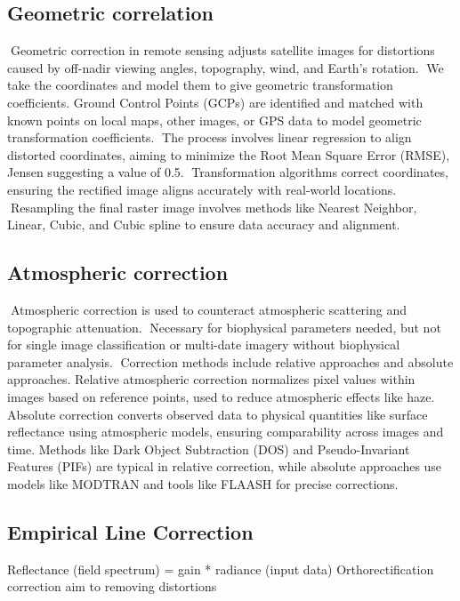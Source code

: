 \documentclass[
  letterpaper,
  DIV=11,
  numbers=noendperiod]{scrreprt}
\begin{document}
\subsection{Geometric correlation}\label{geometric-correlation}

Geometric correction in remote sensing adjusts satellite images for
distortions caused by off-nadir viewing angles, topography, wind, and
Earth's rotation. We take the coordinates and model them to give
geometric transformation coefficients. Ground Control Points (GCPs) are
identified and matched with known points on local maps, other images, or
GPS data to model geometric transformation coefficients. The process
involves linear regression to align distorted coordinates, aiming to
minimize the Root Mean Square Error (RMSE), Jensen suggesting a value of
0.5. Transformation algorithms correct coordinates, ensuring the
rectified image aligns accurately with real-world locations. Resampling
the final raster image involves methods like Nearest Neighbor, Linear,
Cubic, and Cubic spline to ensure data accuracy and alignment.

\subsection{Atmospheric correction}\label{atmospheric-correction}

Atmospheric correction is used to counteract atmospheric scattering and
topographic attenuation. Necessary for biophysical parameters needed,
but not for single image classification or multi-date imagery without
biophysical parameter analysis. Correction methods include relative
approaches and absolute approaches. Relative atmospheric correction
normalizes pixel values within images based on reference points, used to
reduce atmospheric effects like haze. Absolute correction converts
observed data to physical quantities like surface reflectance using
atmospheric models, ensuring comparability across images and time.
Methods like Dark Object Subtraction (DOS) and Pseudo-Invariant Features
(PIFs) are typical in relative correction, while absolute approaches use
models like MODTRAN and tools like FLAASH for precise corrections.

\subsection{Empirical Line Correction}\label{empirical-line-correction}

Reflectance (field spectrum) = gain * radiance (input data)
Orthorectification correction aim to removing distortions
\end{document}
